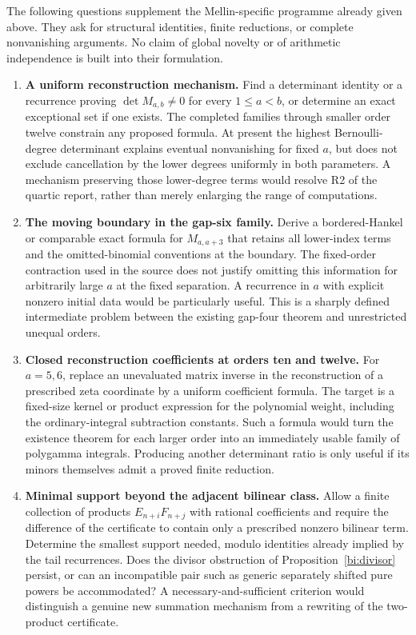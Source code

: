 The following questions supplement the Mellin-specific programme
already given above. They ask for structural identities, finite
reductions, or complete nonvanishing arguments. No claim of global
novelty or of arithmetic independence is built into their formulation.

\begin{enumerate}[leftmargin=*,label=\textbf{R\arabic*.}]

\item \textbf{A uniform reconstruction mechanism.}
Find a determinant identity or a recurrence proving
$\det M_{a,b}\ne0$ for every $1\le a<b$, or determine an exact
exceptional set if one exists. The completed families through smaller
order twelve constrain any proposed formula. At present the highest
Bernoulli-degree determinant explains eventual nonvanishing for fixed
$a$, but does not exclude cancellation by the lower degrees uniformly
in both parameters. A mechanism preserving those lower-degree terms
would resolve R2 of the quartic report, rather than merely enlarging
the range of computations.

\item \textbf{The moving boundary in the gap-six family.}
Derive a bordered-Hankel or comparable exact formula for $M_{a,a+3}$
that retains all lower-index terms and the omitted-binomial
conventions at the boundary. The fixed-order contraction used in the
source does not justify omitting this information for arbitrarily
large $a$ at the fixed separation. A recurrence in $a$
with explicit nonzero initial data would be particularly useful.
This is a sharply defined intermediate problem between the existing
gap-four theorem and unrestricted unequal orders.

\item \textbf{Closed reconstruction coefficients at orders ten and twelve.}
For $a=5,6$, replace an unevaluated matrix inverse in the reconstruction
of a prescribed zeta coordinate by a uniform coefficient formula.
The target is a fixed-size kernel or product expression for the
polynomial weight, including the ordinary-integral subtraction
constants. Such a formula would turn the existence theorem for each
larger order into an immediately usable family of polygamma
integrals. Producing another determinant ratio is only useful if its
minors themselves admit a proved finite reduction.

\item \textbf{Minimal support beyond the adjacent bilinear class.}
Allow a finite collection of products $E_{n+i}F_{n+j}$ with rational
coefficients and require the difference of the certificate to contain
only a prescribed nonzero bilinear term. Determine the smallest
support needed, modulo identities already implied by the tail
recurrences. Does the divisor obstruction of
Proposition~\ref{bi:divisor} persist, or can an incompatible pair such
as generic separately shifted pure powers be accommodated?
A necessary-and-sufficient criterion would distinguish a genuine new
summation mechanism from a rewriting of the two-product certificate.


\end{enumerate}
